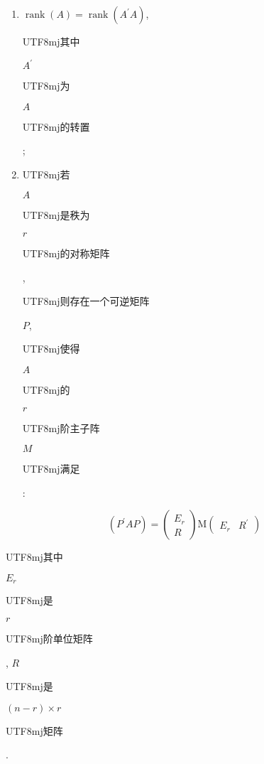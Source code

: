 \documentclass[10pt]{article}
\begin{document}
\begin{enumerate}
  \item $\operatorname{rank}(A)=\operatorname{rank}\left(A^{\prime} A\right)$, \begin{CJK}{UTF8}{mj}其中\end{CJK} $A^{\prime}$ \begin{CJK}{UTF8}{mj}为\end{CJK} $A$ \begin{CJK}{UTF8}{mj}的转置\end{CJK};

  \item \begin{CJK}{UTF8}{mj}若\end{CJK} $A$ \begin{CJK}{UTF8}{mj}是秩为\end{CJK} $r$ \begin{CJK}{UTF8}{mj}的对称矩阵\end{CJK}, \begin{CJK}{UTF8}{mj}则存在一个可逆矩阵\end{CJK} $P$, \begin{CJK}{UTF8}{mj}使得\end{CJK} $A$ \begin{CJK}{UTF8}{mj}的\end{CJK} $r$ \begin{CJK}{UTF8}{mj}阶主子阵\end{CJK} $M$ \begin{CJK}{UTF8}{mj}满足\end{CJK}:

\end{enumerate}
$$
\left(P^{\prime} A P\right)=\left(\begin{array}{c}
E_{r} \\
R
\end{array}\right) \mathrm{M}\left(\begin{array}{ll}
E_{r} & R^{\prime}
\end{array}\right)
$$
\begin{CJK}{UTF8}{mj}其中\end{CJK} $E_{r}$ \begin{CJK}{UTF8}{mj}是\end{CJK} $r$ \begin{CJK}{UTF8}{mj}阶单位矩阵\end{CJK}, $R$ \begin{CJK}{UTF8}{mj}是\end{CJK} $(n-r) \times r$ \begin{CJK}{UTF8}{mj}矩阵\end{CJK}.
\end{document}
